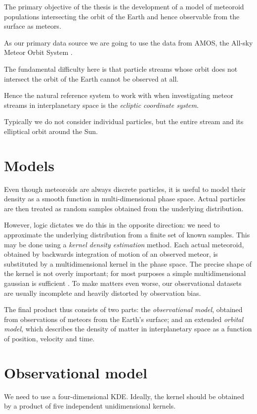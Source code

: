 The primary objective of the thesis is the development of a model of meteoroid populations
intersecting the orbit of the Earth and hence observable from the surface as meteors.

As our primary data source we are going to use the data from AMOS, the All-sky Meteor Orbit System \citep{zigo+2013}.




The fundamental difficulty here is that particle streams whose orbit does not intersect the orbit of the Earth
cannot be observed at all.

Hence the natural reference system to work with when investigating meteor streams in interplanetary space
is the \emph{ecliptic coordinate system}.



Typically we do not consider individual particles, but the entire stream and its elliptical orbit around the Sun.

\section{Models}
    Even though meteoroids are always discrete particles, it is useful to model their density
    as a smooth function in multi-dimensional phase space.
    Actual particles are then treated as random samples obtained from the underlying distribution.

    However, logic dictates we do this in the opposite direction: we need to approximate
    the underlying distribution from a finite set of known samples.
    This may be done using a \emph{kernel density estimation} method.
    Each actual meteoroid, obtained by backwards integration of motion of an observed meteor,
    is substituted by a multidimensional kernel in the phase space. The precise shape of the kernel
    is not overly important; for most purposes a simple multidimensional gaussian is sufficient \cite{...}.
    To make matters even worse, our observational datasets are usually incomplete
    and heavily distorted by observation bias.

    The final product thus consists of two parts: the \emph{observational model},
    obtained from observations of meteors from the Earth's surface;
    and an extended \emph{orbital model}, which describes the density of matter
    in interplanetary space as a function of position, velocity and time.

\section{Observational model} \label{io}
    We need to use a four-dimensional KDE. Ideally, the kernel should be obtained by a product of five
    independent unidimensional kernels.

